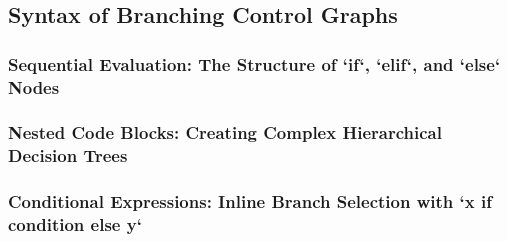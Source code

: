 \subsection{Syntax of Branching Control Graphs}
\subsubsection{Sequential Evaluation: The Structure of `if`, `elif`, and `else` Nodes}
\subsubsection{Nested Code Blocks: Creating Complex Hierarchical Decision Trees}
\subsubsection{Conditional Expressions: Inline Branch Selection with `x if condition else y`}
